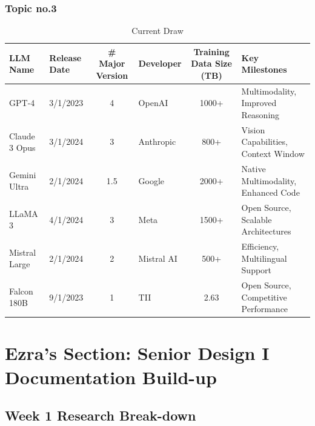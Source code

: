 \documentclass[11pt,letterpaper]{article}
\begin{document}
\subsubsection{Topic no.3}
\begin{table}[H]
\fontsize{11}{11}\selectfont
\centering
\caption*{Current Draw}
\vspace{-7pt}
\begin{tabularx}{\textwidth}{l|l|c|l|c|X}
\toprule
\textbf{LLM Name} & \textbf{Release Date} & \textbf{\# Major Version} & \textbf{Developer} & \textbf{Training Data Size (TB)} & \textbf{Key Milestones} \\
\midrule
GPT-4 & 3/1/2023 & 4 & OpenAI & 1000+ & Multimodality, Improved Reasoning \\
Claude 3 Opus & 3/1/2024 & 3 & Anthropic & 800+ & Vision Capabilities, Context Window \\
Gemini Ultra & 2/1/2024 & 1.5 & Google & 2000+ & Native Multimodality, Enhanced Code \\
LLaMA 3 & 4/1/2024 & 3 & Meta & 1500+ & Open Source, Scalable Architectures \\
Mistral Large & 2/1/2024 & 2 & Mistral AI & 500+ & Efficiency, Multilingual Support \\
Falcon 180B & 9/1/2023 & 1 & TII & 2.63 & Open Source, Competitive Performance \\
\midrule
\bottomrule
\end{tabularx}
\end{table}
\newpage

\section{Ezra's Section: Senior Design I Documentation Build-up}
\subsection{Week 1 Research Break-down}
\end{document}
